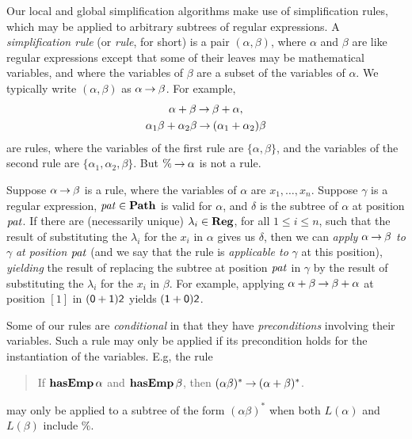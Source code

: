 Our local and global simplification algorithms make use of
simplification rules, which may be applied to arbitrary subtrees of
%
%
regular expressions. A \emph{simplification rule} (or \emph{rule}, for
short) is a pair $(\alpha, \beta)$, where $\alpha$ and $\beta$ are
like regular expressions except that some of their leaves may be
mathematical variables, and where the variables of $\beta$ are a
subset of the variables of $\alpha$. We typically write $(\alpha, \beta)$
as $\alpha\mathbin{\to}\beta$. For example,
\begin{gather*}
\alpha + \beta\mathbin{\to} \beta+\alpha , \\
\alpha_1\beta + \alpha_2\beta \mathbin{\to} (\alpha_1+\alpha_2)\beta
\end{gather*}
are rules, where the variables of the first rule are $\{\alpha,\beta\}$,
and the variables of the second rule are $\{\alpha_1, \alpha_2, \beta\}$.
But $\%\mathbin{\to}\alpha$ is not a rule.

Suppose $\alpha\mathbin{\to}\beta$ is a rule, where the variables of $\alpha$
are $x_1,\ldots,x_n$.  Suppose $\gamma$ is a regular expression,
${\it pat}\in\mathbf{Path}$ is valid for $\alpha$, and $\delta$ is the subtree of
$\alpha$ at position ${\it pat}$.  If there are (necessarily unique)
$\lambda_i\in\mathbf{Reg}$, for all $1\leq i\leq n$, such that the result of
substituting the $\lambda_i$ for the $x_i$ in $\alpha$ gives us
$\delta$, then we can \emph{apply} $\alpha\mathbin{\to}\beta$ \emph{to}
%
%
$\gamma$ \emph{at position} ${\it pat}$ (and we say that the rule is
\emph{applicable to} $\gamma$ at this position), \emph{yielding} the
result of replacing the subtree at position ${\it pat}$ in $\gamma$ by the
result of substituting the $\lambda_i$ for the $x_i$ in $\beta$.  For
example, applying $\alpha+\beta\mathbin{\to}\beta+\alpha$ at position $[1]$ in
$(\mathsf{0} + \mathsf{1})\mathsf{2}$ yields $(\mathsf{1} + \mathsf{0})\mathsf{2}$.

Some of our rules are \emph{conditional} in that they have
\emph{preconditions} involving their variables. Such a rule may only be
applied if its precondition holds for the instantiation of the variables.
E.g, the rule
\begin{quotation}
  If $\mathbf{hasEmp}\,\alpha$ and $\mathbf{hasEmp}\,\beta$, then
  $(\alpha\beta)^* \mathbin{\to} (\alpha+\beta)^*$.
\end{quotation}
may only be applied to a subtree of the form $(\alpha\beta)^*$ when
both $L(\alpha)$ and $L(\beta)$ include $\%$.

